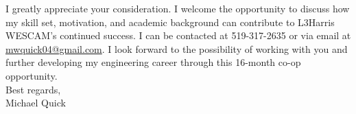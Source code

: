 \documentclass[11pt]{article}
\begin{document}
I greatly appreciate your consideration. I welcome the opportunity to discuss how my skill set, motivation, and academic background can contribute to L3Harris WESCAM’s continued success. I can be contacted at 519-317-2635 or via email at \href{mailto:mwquick04@gmail.com}{mwquick04@gmail.com}. I look forward to the possibility of working with you and further developing my engineering career through this 16-month co-op opportunity.\\

\noindent Best regards,\\

\noindent Michael Quick
\end{document}
